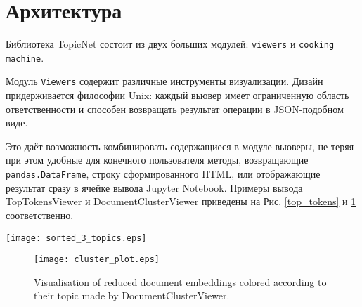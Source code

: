 \section{Архитектура} 

Библиотека TopicNet состоит из двух больших модулей: \texttt{viewers} и \texttt{cooking machine}.  

Модуль \texttt{Viewers} содержит различные инструменты визуализации. Дизайн придерживается философии Unix: каждый вьювер имеет ограниченную область ответственности и способен возвращать результат операции в JSON-подобном виде.

Это даёт возможность комбинировать содержащиеся в модуле вьюверы, не теряя при этом удобные для конечного пользователя методы, возвращающие \texttt{pandas.DataFrame}, строку сформированного HTML, или отображающие результат сразу в ячейке вывода Jupyter Notebook. Примеры вывода TopTokensViewer и DocumentClusterViewer приведены на Рис. \ref{top_tokens} и \ref{documents_clusters} соответственно.  

\begin{figure*}[h]

    \centering

    \texttt{[image: sorted\_3\_topics.eps]}

    \caption{Output of the TopTokensViewer. Token score in the topic is calculated for every token, score function can be specified at the stage of a viewer initialization.}

\label{top_tokens}

\end{figure*} 

\begin{figure}[h]

    \centering

    \texttt{[image: cluster\_plot.eps]}

    \caption{Visualisation of reduced document embeddings colored according to their topic made by DocumentClusterViewer.}

\label{documents_clusters}

\end{figure} 



